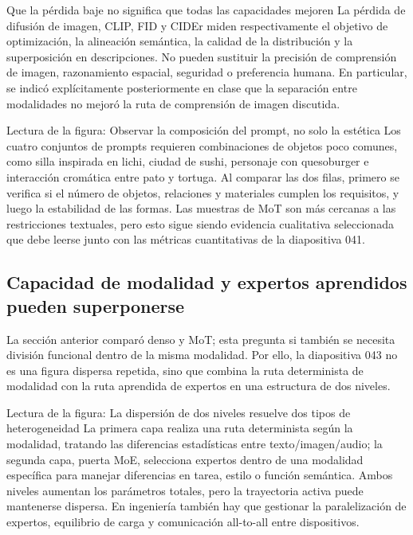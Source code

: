 \begin{warningbox}{Que la pérdida baje no significa que todas las capacidades mejoren}
La pérdida de difusión de imagen, CLIP, FID y CIDEr miden respectivamente el objetivo de optimización, la alineación semántica, la calidad de la distribución y la superposición en descripciones. No pueden sustituir la precisión de comprensión de imagen, razonamiento espacial, seguridad o preferencia humana. En particular, se indicó explícitamente posteriormente en clase que la separación entre modalidades no mejoró la ruta de comprensión de imagen discutida.
\end{warningbox}


\begin{knowledgebox}{Lectura de la figura: Observar la composición del prompt, no solo la estética}
Los cuatro conjuntos de prompts requieren combinaciones de objetos poco comunes, como silla inspirada en lichi, ciudad de sushi, personaje con quesoburger e interacción cromática entre pato y tortuga. Al comparar las dos filas, primero se verifica si el número de objetos, relaciones y materiales cumplen los requisitos, y luego la estabilidad de las formas. Las muestras de MoT son más cercanas a las restricciones textuales, pero esto sigue siendo evidencia cualitativa seleccionada que debe leerse junto con las métricas cuantitativas de la diapositiva 041.
\end{knowledgebox}

\subsection{Capacidad de modalidad y expertos aprendidos pueden superponerse}

La sección anterior comparó denso y MoT; esta pregunta si también se necesita división funcional dentro de la misma modalidad. Por ello, la diapositiva 043 no es una figura dispersa repetida, sino que combina la ruta determinista de modalidad con la ruta aprendida de expertos en una estructura de dos niveles.


\begin{knowledgebox}{Lectura de la figura: La dispersión de dos niveles resuelve dos tipos de heterogeneidad}
La primera capa realiza una ruta determinista según la modalidad, tratando las diferencias estadísticas entre texto/imagen/audio; la segunda capa, puerta MoE, selecciona expertos dentro de una modalidad específica para manejar diferencias en tarea, estilo o función semántica. Ambos niveles aumentan los parámetros totales, pero la trayectoria activa puede mantenerse dispersa. En ingeniería también hay que gestionar la paralelización de expertos, equilibrio de carga y comunicación all-to-all entre dispositivos.
\end{knowledgebox}

